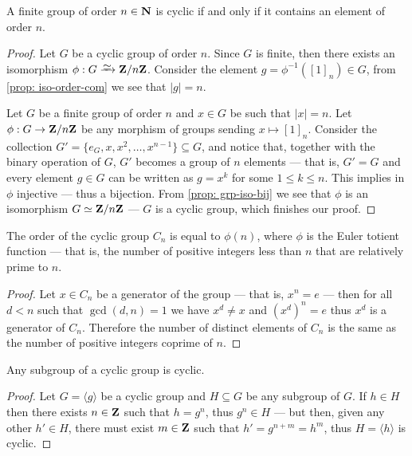 \begin{proposition}
    A finite group of order \(n \in \mathbf{N}\) is cyclic if and only if it contains an
    element of order \(n\).
\end{proposition}

\begin{proof}
    Let \(G\) be a cyclic group of order \(n\). Since \(G\) is finite, then there
    exists an isomorphism \(\phi: G \isoto \Z/n\Z\). Consider the element \(g =
    \phi^{-1}({[1]}_n) \in G\), from \cref{prop: iso-order-com} we see that \(|g| =
    n\).

    Let \(G\) be a finite group of order \(n\) and \(x \in G\) be such that \(|x|
    = n\). Let \(\phi: G \to \mathbf{Z}/n\mathbf{Z}\) be any morphism of groups sending \(x
    \mapsto {[1]}_n\). Consider the collection \(G' = \{e_G, x, x^2, \dots,
    x^{n-1}\} \subseteq G\), and notice that, together with the binary operation
    of \(G\), \(G'\) becomes a group of \(n\) elements --- that is, \(G' = G\) and
    every element \(g \in G\) can be written as \(g = x^k\) for some \(1 \leq k
    \leq n\). This implies in \(\phi\) injective --- thus a bijection. From
    \cref{prop: grp-iso-bij} we see that \(\phi\) is an isomorphism \(G \simeq
    \mathbf{Z}/n\mathbf{Z}\) --- \(G\) is a cyclic group, which finishes our proof.
\end{proof}

\begin{proposition}
    \label{prop:order-cyclic-totient}
    The order of the cyclic group \(C_n\) is equal to \(\phi(n)\), where \(\phi\) is
    the Euler totient function --- that is, the number of positive integers less
    than \(n\) that are relatively prime to \(n\).
\end{proposition}

\begin{proof}
    Let \(x \in C_n\) be a generator of the group --- that is, \(x^n = e\) --- then
    for all \(d < n\) such that \(\gcd(d, n) = 1\) we have \(x^d \neq x\) and
    \((x^d)^n = e\) thus \(x^d\) is a generator of \(C_n\). Therefore the number
    of distinct elements of \(C_n\) is the same as the number of positive integers
    coprime of \(n\).
\end{proof}

\begin{proposition}[Subgroup]
    \label{prop:subgroup-of-cyclic-group}
    Any subgroup of a cyclic group is cyclic.
\end{proposition}

\begin{proof}
    Let \(G = \langle g \rangle\) be a cyclic group and \(H \subseteq G\) be any
    subgroup of \(G\). If \(h \in H\) then there exists \(n \in \mathbf{Z}\) such that \(h =
    g^n\), thus \(g^n \in H\) --- but then, given any other \(h' \in H\), there must
    exist \(m \in \mathbf{Z}\) such that \(h' = g^{n + m} = h^m\), thus \(H = \langle h
    \rangle\) is cyclic.
\end{proof}

